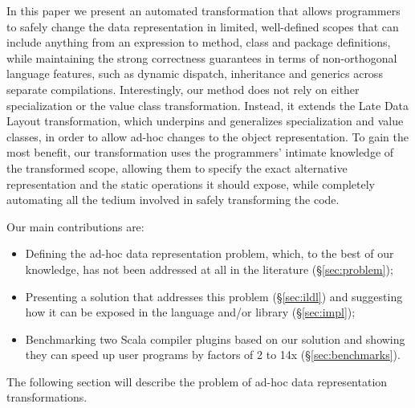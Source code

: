In this paper we present an automated transformation that allows programmers to safely change the data representation in limited, well-defined scopes that can include anything from an expression to method, class and package definitions, while maintaining the strong correctness guarantees in terms of non-orthogonal language features, such as dynamic dispatch, inheritance and generics across separate compilations. Interestingly, our method does not rely on either specialization or the value class transformation. Instead, it extends the Late Data Layout transformation, which underpins and generalizes specialization and value classes, in order to allow ad-hoc changes to the object representation. To gain the most benefit, our transformation uses the programmers' intimate knowledge of the transformed scope, allowing them to specify the exact alternative representation and the static operations it should expose, while completely automating all the tedium involved in safely transforming the code.

Our main contributions are:
\begin{itemize}
  \item Defining the ad-hoc data representation problem, which, to the best of our knowledge, has not been addressed at all in the literature (\S\ref{sec:problem});
  \item Presenting a solution that addresses this problem (\S\ref{sec:ildl}) and suggesting how it can be exposed in the language and/or library (\S\ref{sec:impl});
  \item Benchmarking two Scala compiler plugins based on our solution and showing they can speed up user programs by factors of 2 to 14x (\S\ref{sec:benchmarks}).
\end{itemize}

The following section will describe the problem of ad-hoc data representation transformations.
